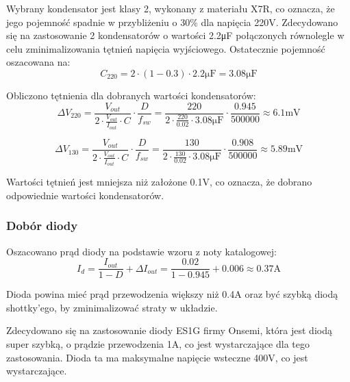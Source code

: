 \documentclass[../../main.tex]{subfiles}
\begin{document}
Wybrany kondensator jest klasy 2, wykonany z materiału X7R, co oznacza, że jego pojemność spadnie w przybliżeniu o 30\% dla napięcia 220\si{\volt}.
Zdecydowano się na zastosowanie 2 kondensatorów o wartości 2.2\si{\micro\farad} połączonych równolegle w celu zminimalizowania tętnień napięcia wyjściowego.
Ostatecznie pojemność oszacowana na:
\begin{equation}
    C_{220} = 2 \cdot (1-0.3) \cdot 2.2\si{\micro\farad} = 3.08\si{\micro\farad}
\end{equation}

Obliczono tętnienia dla dobranych wartości kondensatorów:
\begin{equation}
    \Delta V_{220} = \frac{V_{out}}{2 \cdot \frac{V_{out}}{I_{out}} \cdot C} \cdot \frac{D}{f_{sw}} = \frac{220}{2 \cdot \frac{220}{0.02} \cdot 3.08\si{\micro\farad}} \cdot \frac{0.945}{500000} \approx 6.1\si{\milli\volt}
\end{equation}

\begin{equation}
    \Delta V_{130} = \frac{V_{out}}{2 \cdot \frac{V_{out}}{I_{out}} \cdot C} \cdot \frac{D}{f_{sw}} = \frac{130}{2 \cdot \frac{130}{0.02} \cdot 3.08\si{\micro\farad}} \cdot \frac{0.908}{500000} \approx 5.89\si{\milli\volt}
\end{equation}

Wartości tętnień jest mniejsza niż założone 0.1\si{\volt}, co oznacza, że dobrano odpowiednie wartości kondensatorów.

\subsubsection{Dobór diody}
Oszacowano prąd diody na podstawie wzoru z noty katalogowej:
\begin{equation}
    I_{d} = \frac{I_{out}}{1-D} + \Delta I_{out} = \frac{0.02}{1-0.945} + 0.006 \approx 0.37\si{\ampere}
\end{equation}

Dioda powina mieć prąd przewodzenia większy niż 0.4\si{\ampere} oraz być szybką diodą shottky'ego, by zminimalizować straty w układzie.

Zdecydowano się na zastosowanie diody ES1G firmy Onsemi, 
która jest diodą super szybką, o prądzie przewodzenia 1\si{\ampere}, co jest wystarczające dla tego zastosowania.
Dioda ta ma maksymalne napięcie wsteczne 400\si{\volt}, co jest wystarczające.
\end{document}
